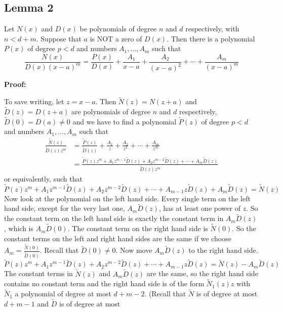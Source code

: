 \subsection{Lemma 2}
Let \(N(x)\) and \(D(x)\) be polynomials of degree \(n\) and \(d\) respectively, with \(n < d + m\).
Suppose that \(a\) is NOT a zero of \(D(x)\). Then there is a polynomial \(P(x)\) of degree \(p < d\) and
numbers \(A_1, \dots, A_m\) such that
\[
\frac{N(x)}{D(x) (x-a)^m} = \frac{P(x)}{D(x)} + \frac{A_1}{x-a} + \frac{A_2}{(x-a)^2} + \cdots + \frac{A_m}{(x-a)^m}
\]

\textbf{Proof:} 

To save writing, let \(z = x - a\). Then \(\tilde{N}(z) = N(z + a)\) and \(\tilde{D}(z) = D(z + a)\)
are polynomials of degree \(n\) and \(d\) respectively, \(\tilde{D}(0) = D(a) \neq 0\) and we have to find a
polynomial \(\tilde{P}(z)\) of degree \(p < d\) and numbers \(A_1, \dots, A_m\) such that
\begin{align*}
\frac{\tilde{N}(z)}{\tilde{D}(z) z^m} &= \frac{\tilde{P}(z)}{\tilde{D}(z)} + \frac{A_1}{z} + \frac{A_2}{z^2} + \cdots + \frac{A_m}{z^m} \\
&= \frac{\tilde{P}(z) z^m + A_1 z^{m-1} \tilde{D}(z) + A_2 z^{m-2} \tilde{D}(z) + \cdots + A_m \tilde{D}(z)}{\tilde{D}(z) z^m}
\end{align*}
or equivalently, such that
\[
\tilde{P}(z)z^m + A_1 z^{m-1} \tilde{D}(z) + A_2 z^{m-2} \tilde{D}(z) + \cdots + A_{m-1} z \tilde{D}(z) + A_m \tilde{D}(z) = \tilde{N}(z)
\]
Now look at the polynomial on the left hand side. Every single term on the left hand side,
except for the very last one, \(A_m \tilde{D}(z)\), has at least one power of \(z\). So the constant term on
the left hand side is exactly the constant term in \(A_m \tilde{D}(z)\), which is \(A_m \tilde{D}(0)\). The constant
term on the right hand side is \(\tilde{N}(0)\). So the constant terms on the left and right hand sides
are the same if we choose \(A_m = \frac{\tilde{N}(0)}{\tilde{D}(0)}\). Recall that \(\tilde{D}(0) \neq 0\). Now move \(A_m \tilde{D}(z)\) to the right
hand side.
\[
\tilde{P}(z)z^m + A_1 z^{m-1} \tilde{D}(z) + A_2 z^{m-2} \tilde{D}(z) + \cdots + A_{m-1} z \tilde{D}(z) = \tilde{N}(z) - A_m \tilde{D}(z)
\]
The constant terms in \(\tilde{N}(z)\) and \(A_m \tilde{D}(z)\) are the same, so the right hand side contains no
constant term and the right hand side is of the form \(\tilde{N}_1(z)z\) with \(\tilde{N}_1\) a polynomial of degree
at most \(d + m - 2\). (Recall that \(\tilde{N}\) is of degree at most \(d + m - 1\) and \(\tilde{D}\) is of degree at most
